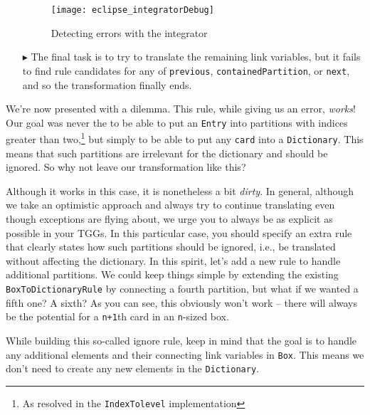 \begin{itemize}
\begin{figure}[htb]
\begin{center}
  \texttt{[image: eclipse\_integratorDebug]}
  \caption{Detecting errors with the integrator}
  \label{eclipse:integrator_debugSuccess}
\end{center}
\end{figure}

\item[$\blacktriangleright$] The final task is to try to translate the remaining link variables, but it fails to find rule candidates for any of
\texttt{previous}, \texttt{containedPartition}, or \texttt{next}, and so the transformation finally ends.

\end{itemize}

We're now presented with a dilemma. This rule, while giving us an error, \emph{works}! Our goal was never the to be able to put an \texttt{Entry} into
partitions with indices greater than two,\footnote{As resolved in the \texttt{IndexTolevel} implementation} but simply to be able to put any \texttt{card} into
a \texttt{Dictionary}. This means that such partitions are irrelevant for the dictionary and should be ignored. So why not leave our transformation like this?

Although it works in this case, it is nonetheless a bit \emph{dirty}. In general, although we take an optimistic approach and always try to continue
translating even though exceptions are flying about, we urge you to always be as explicit as possible in your TGGs. In this particular case, you should specify
an extra rule that clearly states how such partitions should be ignored, i.e., be translated without affecting the dictionary. In this spirit, let's add a new
rule to handle additional partitions. We could keep things simple by extending the existing \texttt{BoxToDictionaryRule} by connecting a fourth partition, but
what if we wanted a fifth one? A sixth? As you can see, this obviously won't work -- there will always be the potential for a \texttt{n+1}th card in an \texttt{n}-sized box. 

While building this so-called ignore rule, keep in mind that the goal is to handle any additional elements and their connecting link variables in \texttt{Box}.
This means we don't need to create any new elements in the \texttt{Dictionary}.






